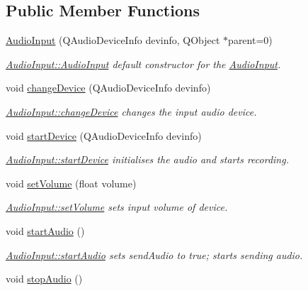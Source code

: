 \subsection*{Public Member Functions}
\begin{DoxyCompactItemize}
\item 
\hyperlink{class_audio_input_a49f4a3466e987468f1f94bed64e29fa9}{Audio\+Input} (Q\+Audio\+Device\+Info devinfo, Q\+Object $\ast$parent=0)
\begin{DoxyCompactList}\small\item\em \hyperlink{class_audio_input_a49f4a3466e987468f1f94bed64e29fa9}{Audio\+Input\+::\+Audio\+Input} default constructor for the \hyperlink{class_audio_input}{Audio\+Input}. \end{DoxyCompactList}\item 
void \hyperlink{class_audio_input_a52f68fb48010592d01166906b2961e21}{change\+Device} (Q\+Audio\+Device\+Info devinfo)
\begin{DoxyCompactList}\small\item\em \hyperlink{class_audio_input_a52f68fb48010592d01166906b2961e21}{Audio\+Input\+::change\+Device} changes the input audio device. \end{DoxyCompactList}\item 
void \hyperlink{class_audio_input_ad8bc7b12ac3476c85be6b19a8c4f9330}{start\+Device} (Q\+Audio\+Device\+Info devinfo)
\begin{DoxyCompactList}\small\item\em \hyperlink{class_audio_input_ad8bc7b12ac3476c85be6b19a8c4f9330}{Audio\+Input\+::start\+Device} initialises the audio and starts recording. \end{DoxyCompactList}\item 
void \hyperlink{class_audio_input_a268775cff2a682024a5d68308aa909c2}{set\+Volume} (float volume)
\begin{DoxyCompactList}\small\item\em \hyperlink{class_audio_input_a268775cff2a682024a5d68308aa909c2}{Audio\+Input\+::set\+Volume} sets input volume of device. \end{DoxyCompactList}\item 
\hypertarget{class_audio_input_a28aecfc4dc6d576674ee1b923c3d6f24}{void \hyperlink{class_audio_input_a28aecfc4dc6d576674ee1b923c3d6f24}{start\+Audio} ()}\label{class_audio_input_a28aecfc4dc6d576674ee1b923c3d6f24}

\begin{DoxyCompactList}\small\item\em \hyperlink{class_audio_input_a28aecfc4dc6d576674ee1b923c3d6f24}{Audio\+Input\+::start\+Audio} sets send\+Audio to true; starts sending audio. \end{DoxyCompactList}\item 
\hypertarget{class_audio_input_a90062672a92bb9250de567e1746913c7}{void \hyperlink{class_audio_input_a90062672a92bb9250de567e1746913c7}{stop\+Audio} ()}\label{class_audio_input_a90062672a92bb9250de567e1746913c7}


\end{DoxyCompactItemize}
